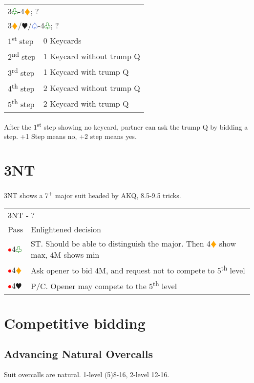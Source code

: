 \documentclass{article}
\renewcommand{\sp}{\textcolor{RoyalBlue}{$\varspade$}}
\newcommand{\he}{\textcolor{RubineRed}{$\varheart$}}
\newcommand{\di}{\textcolor{Orange}{$\vardiamond$}}
\newcommand{\cl}{\textcolor{Green}{$\varclub$}}
\newcommand{\nt}{\relsize{-1}NT\relsize{1}}
\newcommand{\up}{\textsuperscript{+}}
\newcommand{\al}{\textcolor{red}{$\bullet$}}
\begin{document}
\begin{tabular}{|l|p{6.5cm}}
	\multicolumn{2}{l}{3\cl{}-4\di{}; ?} \\
	\multicolumn{2}{l}{3\di{}/\he{}/\sp{}-4\cl{}; ?}\\
	1\textsuperscript{st} step & 0 Keycards \\
	2\textsuperscript{nd} step & 1 Keycard without trump Q \\
	3\textsuperscript{rd} step & 1 Keycard with trump Q \\
	4\textsuperscript{th} step & 2 Keycard without trump Q \\
	5\textsuperscript{th} step & 2 Keycard with trump Q \\
\end{tabular}

\medskip

After the 1\textsuperscript{st} step showing no keycard, partner can ask the trump Q by bidding a step. +1 Step means no, +2 step means yes.




\section{3\nt{}}

3\nt{} shows a 7\up{} major suit headed by AKQ, 8.5-9.5 tricks. \\

\begin{tabular}{|l|p{6.5cm}}
	\multicolumn{2}{l}{3\nt{} - ?}\\
	Pass & Enlightened decision \\
	\al{}4\cl{} & ST. Should be able to distinguish the major. Then 4\di{} show max, 4M shows min \\
	\al{}4\di{} & Ask opener to bid 4M, and request not to compete to 5\textsuperscript{th} level \\
	\al{}4\he{} & P/C. Opener may compete to the 5\textsuperscript{th} level \\
\end{tabular}

\section{Competitive bidding}

\subsection{Advancing Natural Overcalls}
Suit overcalls are natural. 1-level (5)8-16, 2-level 12-16. \\
\end{document}
